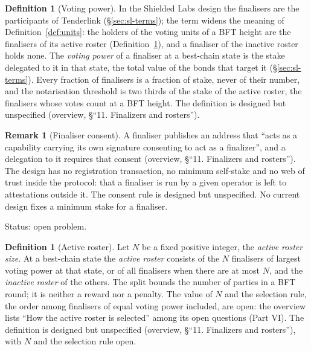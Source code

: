 \documentclass[11pt,a4paper]{article}
\theoremstyle{definition}
\newtheorem{definition}[theorem]{Definition}
\newtheorem{remark}[theorem]{Remark}
\begin{document}
\begin{definition}[Voting power]\label{def:voting-power}
In the Shielded Labs design the finalisers are the participants of
Tenderlink (\S\ref{sec:sl-terms}); the term widens the meaning of
Definition~\ref{def:units}: the holders of the voting units of a BFT height
are the finalisers of its active roster (Definition~\ref{def:active-roster}),
and a finaliser of the inactive roster holds none. The \emph{voting
power} of a finaliser at a best-chain state is the stake delegated to it in
that state, the total value of the bonds that target it
(\S\ref{sec:sl-terms}). Every fraction of finalisers is a fraction of stake,
never of their number, and the notarisation threshold is two thirds of the
stake of the active roster, the finalisers whose votes count at a BFT
height. The definition is designed but unspecified (overview, \S``11. Finalizers
and rosters'').
\end{definition}

\begin{remark}[Finaliser consent]\label{rem:opt-in}
A finaliser publishes an address that ``acts as a capability carrying its
own signature consenting to act as a finalizer'', and a delegation to it
requires that consent (overview, \S``11. Finalizers and rosters''). The design
has no registration transaction, no minimum self-stake and no web of trust
inside the protocol: that a finaliser is run by a given operator is left to
attestations outside it. The consent rule is designed but unspecified. No
current design fixes a minimum stake for a finaliser.

Status: open problem.
\end{remark}

\begin{definition}[Active roster]\label{def:active-roster}
Let $N$ be a fixed positive integer, the \emph{active roster size}. At a
best-chain state the \emph{active roster} consists of the $N$ finalisers of
largest voting power at that state, or of all finalisers when there are at
most $N$, and the \emph{inactive roster} of the others. The split bounds the
number of parties in a BFT round; it is neither a reward nor a penalty. The
value of $N$ and the selection rule, the order among finalisers of equal
voting power included, are open: the overview lists ``How the active roster
is selected'' among its open questions (Part VI). The definition is designed but
unspecified (overview, \S``11. Finalizers and rosters''), with $N$ and the
selection rule open.
\end{definition}
\end{document}
